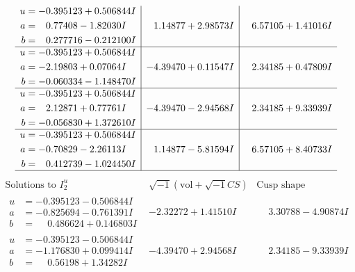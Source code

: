 \documentclass[1p]{elsarticle_modified}
\theoremstyle{definition}
\newcommand{\I}{\sqrt{-1}}
\begin{document}
$$\begin{array}{c|c|c}
\begin{aligned}
u &= -0.395123 + 0.506844 I \\
a &= \phantom{-}0.77408 - 1.82030 I \\
b &= \phantom{-}0.277716 - 0.212100 I\end{aligned}
 & \phantom{-}1.14877 + 2.98573 I & \phantom{-}6.57105 + 1.41016 I \\ \hline\begin{aligned}
u &= -0.395123 + 0.506844 I \\
a &= -2.19803 + 0.07064 I \\
b &= -0.060334 - 1.148470 I\end{aligned}
 & -4.39470 + 0.11547 I & \phantom{-}2.34185 + 0.47809 I \\ \hline\begin{aligned}
u &= -0.395123 + 0.506844 I \\
a &= \phantom{-}2.12871 + 0.77761 I \\
b &= -0.056830 + 1.372610 I\end{aligned}
 & -4.39470 - 2.94568 I & \phantom{-}2.34185 + 9.33939 I \\ \hline\begin{aligned}
u &= -0.395123 + 0.506844 I \\
a &= -0.70829 - 2.26113 I \\
b &= \phantom{-}0.412739 - 1.024450 I\end{aligned}
 & \phantom{-}1.14877 - 5.81594 I & \phantom{-}6.57105 + 8.40733 I\\
 \hline 
 \end{array}$$\newpage$$\begin{array}{c|c|c}  
\text{Solutions to }I^u_{2}& \I (\text{vol} + \sqrt{-1}CS) & \text{Cusp shape}\\
 \hline 
\begin{aligned}
u &= -0.395123 - 0.506844 I \\
a &= -0.825694 - 0.761391 I \\
b &= \phantom{-}0.486624 + 0.146803 I\end{aligned}
 & -2.32272 + 1.41510 I & \phantom{-}3.30788 - 4.90874 I \\ \hline\begin{aligned}
u &= -0.395123 - 0.506844 I \\
a &= -1.176830 + 0.099414 I \\
b &= \phantom{-}0.56198 + 1.34282 I\end{aligned}
 & -4.39470 + 2.94568 I & \phantom{-}2.34185 - 9.33939 I \\ \hline\begin{aligned}

\end{aligned}
\end{array}$$
\end{document}
